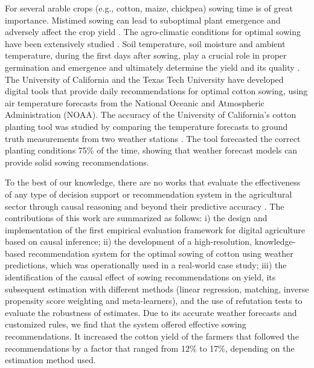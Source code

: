\documentclass[letterpaper]{article} %
\begin{document}
For several arable crops (e.g., cotton, maize, chickpea) sowing time is of great importance. Mistimed sowing can lead to suboptimal plant emergence and adversely affect the crop yield \cite{huang2016different,nielsen2002delayed,richards2022impact}. 
The agro-climatic conditions for optimal sowing  have been extensively studied \cite{freeland2006agrometeorology,boman2005soil}. Soil temperature, soil moisture and ambient temperature, during the first days after sowing, play a crucial role in proper germination and emergence and ultimately determine the yield and its quality \cite{bradow2010germination,bauer1998planting}. The University of California \cite{california} and the Texas Tech University \cite{barbato2011temperature} have developed digital tools that provide daily recommendations for optimal cotton sowing, using air temperature forecasts from the National Oceanic and Atmospheric Administration (NOAA). The accuracy of the University of California's cotton planting tool was studied by comparing the temperature forecasts to ground truth measurements from two weather stations \cite{munier2004accuracy}. The tool forecasted the correct planting conditions \cite{kerby1989weather} 75\% of the time, showing that weather forecast models can provide solid sowing recommendations.

To the best of our knowledge, there are no works that evaluate the effectiveness of any type of decision support or recommendation system in the agricultural sector through causal reasoning and 
beyond their predictive accuracy \cite{luma2020causal, pasquel2022review}. The contributions of this work are summarized as follows: i) the design and implementation of the first empirical evaluation framework for digital agriculture based on causal inference; ii) the development of a high-resolution, knowledge-based recommendation system for the optimal sowing of cotton using weather predictions, which was operationally used in a real-world case study;
iii) the identification of the causal effect of sowing recommendations on yield, its subsequent estimation with different methods (linear regression, matching, inverse propensity score weighting and meta-learners), and the use of refutation tests to evaluate the robustness of estimates. Due to its accurate weather forecasts and customized rules, we find that the system offered effective sowing recommendations. It increased the cotton yield of the farmers that
followed the recommendations by a factor that ranged from 12\% to 17\%, depending on the estimation method used.
\end{document}
